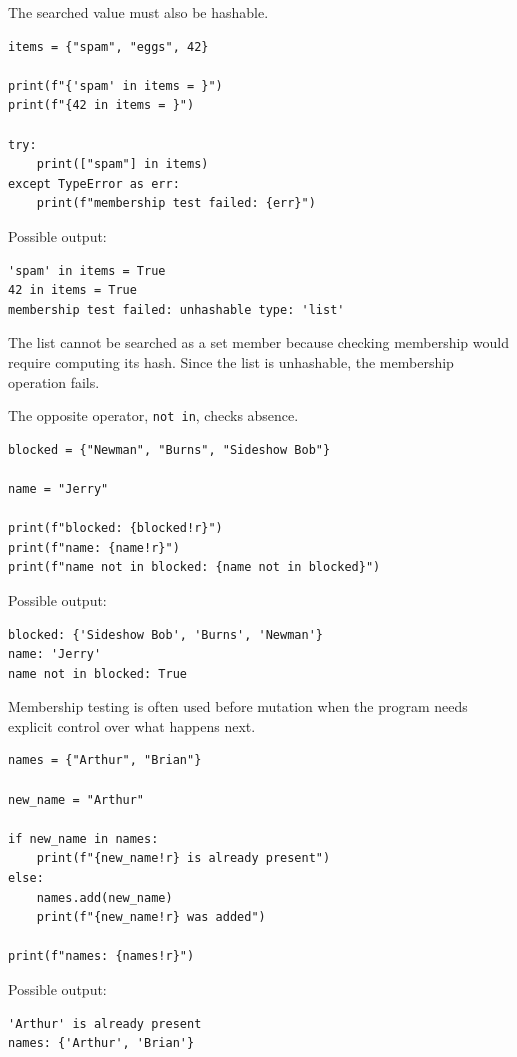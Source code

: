 The searched value must also be hashable.

\begin{verbatim}
items = {"spam", "eggs", 42}

print(f"{'spam' in items = }")
print(f"{42 in items = }")

try:
    print(["spam"] in items)
except TypeError as err:
    print(f"membership test failed: {err}")
\end{verbatim}

Possible output:

\begin{verbatim}
'spam' in items = True
42 in items = True
membership test failed: unhashable type: 'list'
\end{verbatim}

The list cannot be searched as a set member because checking membership would require computing its hash. Since the list is unhashable, the membership operation fails.

The opposite operator, \texttt{not in}, checks absence.

\begin{verbatim}
blocked = {"Newman", "Burns", "Sideshow Bob"}

name = "Jerry"

print(f"blocked: {blocked!r}")
print(f"name: {name!r}")
print(f"name not in blocked: {name not in blocked}")
\end{verbatim}

Possible output:

\begin{verbatim}
blocked: {'Sideshow Bob', 'Burns', 'Newman'}
name: 'Jerry'
name not in blocked: True
\end{verbatim}

Membership testing is often used before mutation when the program needs explicit control over what happens next.

\begin{verbatim}
names = {"Arthur", "Brian"}

new_name = "Arthur"

if new_name in names:
    print(f"{new_name!r} is already present")
else:
    names.add(new_name)
    print(f"{new_name!r} was added")

print(f"names: {names!r}")
\end{verbatim}

Possible output:

\begin{verbatim}
'Arthur' is already present
names: {'Arthur', 'Brian'}
\end{verbatim}

